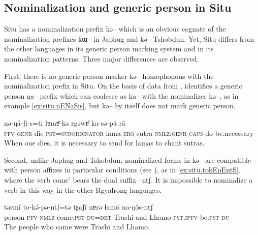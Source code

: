 \documentclass[oldfontcommands,oneside,a4paper,11pt]{article}
\newcommand{\ipa}[1]{{\phon \mbox{#1}}} %
\begin{document}
 
\subsection{Nominalization and generic person in Situ} \label{situ.nmlz}

   Situ has a nominalization prefix \ipa{kə--} which is an obvious cognate of the  nominalization prefixes \ipa{kɯ--} in    Japhug   and \ipa{kə--} Tshobdun. Yet, Situ differs from the other languages in its generic person marking system and in its nominalization patterns. Three major differences are observed.

First, there is no generic person  marker \ipa{kə--} homophonous with the nominalization prefix in Situ.  On the basis of data from \citet[47-9]{wei01ka}, \citet[243-4]{sun14generic} identifies a generic person \ipa{ŋa--} prefix which can coalesce as \ipa{ka--} with the nominalizer \ipa{kə--}, as in example \ref{ex:situ.nENaSis}, but \ipa{kə--} by itself does not mark generic person. 

 \begin{exe}
\ex \label{ex:situ.nENaSis}
\gll
\ipa{nə-ŋá-ʃi-s=ti}  	\ipa{lɐmɐ̄-kə}  	\ipa{rgəwɐ̂}  	\ipa{ka-sə-pā}  	\ipa{rā}  \\
\textsc{pfv-genr}-die-\textsc{pst=subordinator} lama-\textsc{erg} sutra \textsc{nmlz:genr-caus}-do be.necessary \\
\glt When one dies, it is necessary to send for lamas to chant sutras.
  \end{exe}
 
Second, unlike Japhug and Tshobdun, nominalized forms in \ipa{kə--} are compatible with person affixes in particular conditions (see \citealt[11-12]{jacksonlin07}), as in \ref{ex:situ.tokEpEntS}, where the verb  come' bears the dual suffix \ipa{--ntʃ}. It is impossible to nominalize a verb in this way in the other Rgyalrong languages.

 \begin{exe}
\ex \label{ex:situ.tokEpEntS}
\gll
\ipa{tərmî}  	\ipa{to-kə́-pə-ntʃ=tə}  	\ipa{tʂaʃī}  	\ipa{nɐrə}  	\ipa{ɬamō}  	\ipa{na-ŋôs-ntʃ}  	\\
person \textsc{pfv-nmlz}-come:\textsc{pst}-\textsc{du=det} Trashi and Lhamo \textsc{pst.ipfv}-be:\textsc{pst}-\textsc{du} \\
\glt The people who came were Trashi and Lhamo.
  \end{exe}
\end{document}
